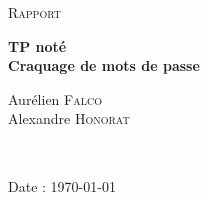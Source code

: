 \documentclass[12pt]{article}
\begin{document}
\begin{titlepage}
\begin{center}
\vspace*{3cm}
\textsc{\Large Rapport}\\[1.5cm]
\vspace{1cm}

	{ \huge \bfseries TP noté\\[0.4cm] }
	{ \bfseries Craquage de mots de passe\\[0.4cm] }

\vspace{3cm}

	\begin{minipage}{0.5\textwidth}
	    \begin{center} \large
	             Aurélien \textsc{Falco}\\
	             Alexandre \textsc{Honorat}\\
	    \end{center}
	\end{minipage}
	\\[2cm]
    \end{center}

\vspace*{4cm}
\begin{flushright}Date : \today\end{flushright}
\end{titlepage}





\end{document}
